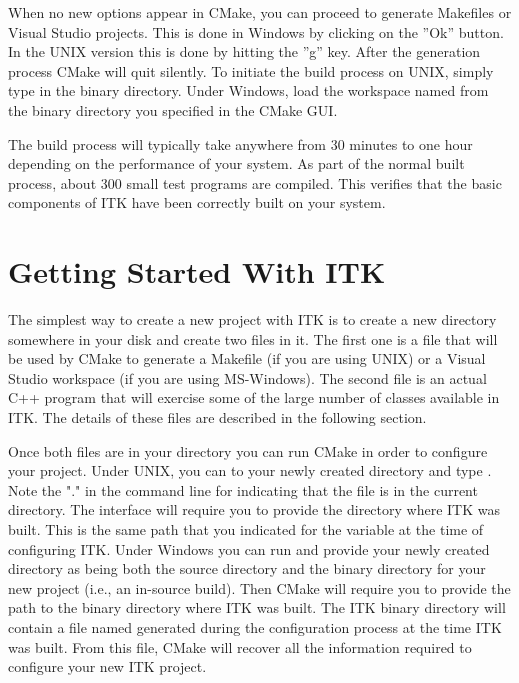 When no new options appear in CMake, you can proceed to generate Makefiles or
Visual Studio projects. This is done in Windows by clicking on the ''Ok''
button.  In the UNIX version this is done by hitting the ''g'' key. After the
generation process CMake will quit silently. To initiate the build process
on UNIX, simply type  in the binary directory. Under Windows, load
the workspace named  from the binary directory you specified
in the CMake GUI.

The build process will typically take anywhere from 30 minutes to one hour
depending on the performance of your system. As part of the normal built
process, about 300 small test programs are compiled. This verifies that the
basic components of ITK have been correctly built on your system.

\section{Getting Started With ITK }
\label{sec:GettingStartedWithITK}
 
The simplest way to create a new project with ITK is to create a new directory
somewhere in your disk and create two files in it. The first one is a
 file that will be used by CMake to generate a Makefile
(if you are using UNIX) or a Visual Studio workspace (if you are using
MS-Windows).  The second file is an actual C++ program that will exercise
some of the large number of classes available in ITK. The details of these files
are described in the following section.

Once both files are in your directory you can run CMake in order to configure
your project. Under UNIX, you can  to your newly created directory
and type . Note the "." in the command line for indicating
that the  file is in the current directory. The
 interface will require you to provide the directory where ITK
was built. This is the same path that you indicated for the
 variable at the time of configuring ITK. Under
Windows you can run  and provide your newly created
directory as being both the source directory and the binary directory for
your new project (i.e., an in-source build). Then CMake will require you to
provide the path to the binary directory where ITK was built. The ITK binary
directory will contain a file named  generated during the
configuration process at the time ITK was built.  From this file, CMake will
recover all the information required to configure your new ITK project.

